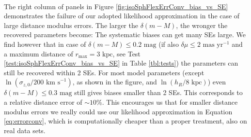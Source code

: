 \\The right column of panels in Figure \ref{fig:isoSphFlexErrConv_bias_vs_SE} demonstrates the failure of our adopted likelihood approximation in the case of large distance modulus errors. The larger the $\delta(m-M)$, the wronger the recovered parameters become: The systematic biases can get many SEs large. We find however that in case of $\delta(m-M) \leq 0.2 \text{ mag}$ (if also $\delta \mu \leq 2 \text{ mas yr}^{-1}$ and a maximum distance of $r_\text{max} = 3 \text{ kpc}$, see Test \ref{test:isoSphFlexErrConv_bias_vs_SE} in Table \ref{tbl:tests}) the parameters can still be recovered within 2 SEs. For most model parameters (except $\ln(\sigma_{z,0} / 200\text{ km s}^{-1})$, as shown in the figure, and $\ln(h_R/ 8\text{ kpc})$) even $\delta(m-M) \leq 0.3 \text{ mag}$ still gives biases smaller than 2 SEs. This corresponds to a relative distance error of $\sim10\%$. This encourages us that for smaller distance modulus errors we really could use our likelihood approximation in Equation \ref{eq:errorconv}, which is computationally cheaper than a proper treatment, also on real data sets.




